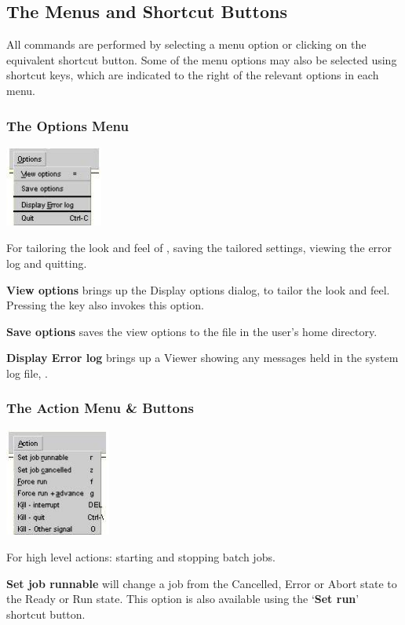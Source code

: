 \subsection{The Menus and Shortcut Buttons}
All commands are performed by selecting a menu option or clicking on the equivalent shortcut button. Some of the menu options may also be
selected using shortcut keys, which are indicated to the right of the relevant options in each menu.

\subsubsection{The Options Menu}
 \includegraphics[width=3.193cm,height=2.646cm]{img/ref15.jpg} 

For tailoring the look and feel of \XmbtqName, saving the tailored settings, viewing the error log and quitting.

\textbf{View options} brings up the Display options dialog, to tailor the look and feel. Pressing the \exampletext{=} key also
invokes this option.

\textbf{Save options} saves the view options to the file \homeconfigpath{} in the user's home directory.

\textbf{Display Error log} brings up a Viewer showing any messages held in the \ProductName{} system log file, .

\subsubsection{The Action Menu \& Buttons}
 \includegraphics[width=3.454cm,height=3.544cm]{img/ref16.jpg} 

For high level actions: starting and stopping batch jobs.

\textbf{Set job runnable} will change a job from the Cancelled, Error or Abort state to the Ready or Run state. This option is also available
using the `\textbf{Set run}' shortcut button.

